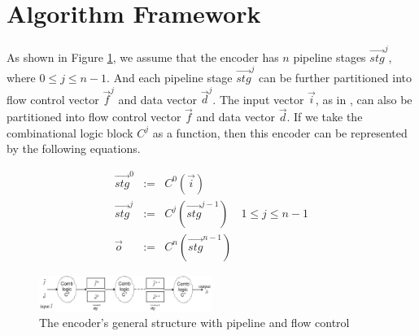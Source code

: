 \documentclass[conference]{IEEEtran}
\begin{document}




\section{Algorithm Framework}\label{sec_framework}


As shown in Figure \ref{fig_pipeenc},
we assume that 
the encoder has $n$ pipeline stages $\vec{stg}^j$,
where $0\le j \le n-1$.
And each pipeline stage $\vec{stg}^j$ can be further partitioned into flow control vector $\vec{f}^j$ and data vector $\vec{d}^j$.
The input vector $\vec{i}$,
as in \cite{QinTODAES15},
can also be partitioned into flow control vector $\vec{f}$ and data vector $\vec{d}$.
If we take the combinational logic block $C^j$ as a function,
then this encoder can be represented by the following equations.

\begin{equation}\label{equ_genpipe}
\begin{array}{cccc}
\vec{stg}^0   & := & C^0(\vec{i})         &\\
\vec{stg}^j   & := & C^j(\vec{stg}^{j-1}) & 1\le j\le n-1\\
\vec{o}       & := & C^n(\vec{stg}^{n-1}) &
\end{array}
\end{equation}


\begin{figure}[b]
\begin{center}
\includegraphics[width=0.5\textwidth]{pipemod1}
\end{center}
\caption{The encoder's general structure with pipeline and flow control}
  \label{fig_pipeenc}
\end{figure}


% 
\end{document}
